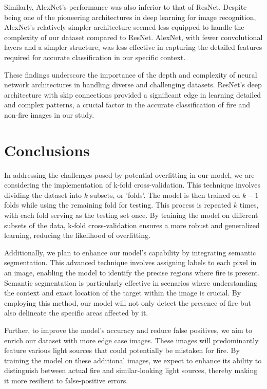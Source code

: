 Similarly, AlexNet's performance was also inferior to that of ResNet. Despite being one of the pioneering architectures in deep learning for image recognition, AlexNet's relatively simpler architecture seemed less equipped to handle the complexity of our dataset compared to ResNet. AlexNet, with fewer convolutional layers and a simpler structure, was less effective in capturing the detailed features required for accurate classification in our specific context.

These findings underscore the importance of the depth and complexity of neural network architectures in handling diverse and challenging datasets. ResNet's deep architecture with skip connections provided a significant edge in learning detailed and complex patterns, a crucial factor in the accurate classification of fire and non-fire images in our study.


\section{Conclusions}


In addressing the challenges posed by potential overfitting in our model, we are considering the implementation of k-fold cross-validation. This technique involves dividing the dataset into \(k\) subsets, or 'folds'. The model is then trained on \(k-1\) folds while using the remaining fold for testing. This process is repeated \(k\) times, with each fold serving as the testing set once. By training the model on different subsets of the data, k-fold cross-validation ensures a more robust and generalized learning, reducing the likelihood of overfitting.

Additionally, we plan to enhance our model's capability by integrating semantic segmentation. This advanced technique involves assigning labels to each pixel in an image, enabling the model to identify the precise regions where fire is present. Semantic segmentation is particularly effective in scenarios where understanding the context and exact location of the target within the image is crucial. By employing this method, our model will not only detect the presence of fire but also delineate the specific areas affected by it.

Further, to improve the model's accuracy and reduce false positives, we aim to enrich our dataset with more edge case images. These images will predominantly feature various light sources that could potentially be mistaken for fire. By training the model on these additional images, we expect to enhance its ability to distinguish between actual fire and similar-looking light sources, thereby making it more resilient to false-positive errors.

